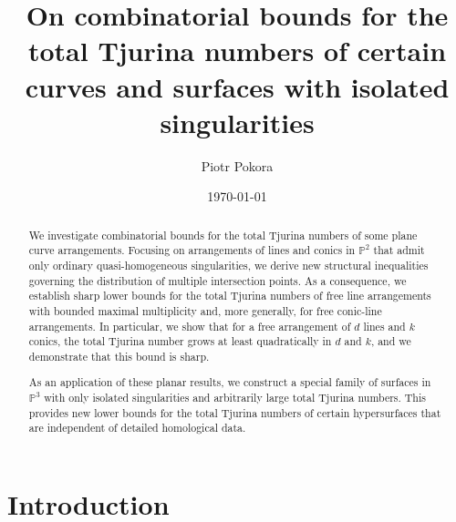 \documentclass[11pt]{article}
\title{\textbf{On combinatorial bounds for the total Tjurina numbers of certain curves and surfaces with isolated singularities}}
\author{Piotr Pokora}
\date{\today}
\theoremstyle{plain}
\theoremstyle{definition}
\theoremstyle{remark}
\begin{document}
\maketitle

\begin{abstract}
We investigate combinatorial bounds for the total Tjurina numbers of some plane curve arrangements. Focusing on arrangements of lines and conics in $\mathbb{P}^2$ that admit only ordinary quasi-homogeneous singularities, we derive new structural inequalities governing the distribution of multiple intersection points. As a consequence, we establish sharp lower bounds for the total Tjurina numbers of free line arrangements with bounded maximal multiplicity and, more generally, for free conic-line arrangements. In particular, we show that for a free arrangement of $d$ lines and $k$ conics, the total Tjurina number grows at least quadratically in $d$ and $k$, and we demonstrate that this bound is sharp.

As an application of these planar results, we construct a special family of surfaces in $\mathbb{P}^{3}$ with only isolated singularities and arbitrarily large total Tjurina numbers. This provides new lower bounds for the total Tjurina numbers of certain hypersurfaces that are independent of detailed homological data.
\end{abstract}
\section{Introduction}
\end{document}
